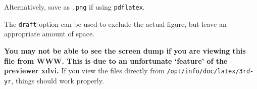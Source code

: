 Alternatively, save as \texttt{.png} if using \texttt{pdflatex}.

The \texttt{draft} option can be used to exclude the actual figure,
but leave an appropriate amount of space.

\textbf{You may not be able to see the screen dump if you are viewing this
file from WWW. This is due to an unfortunate `feature' of the
previewer xdvi.} If you view the files directly from
\texttt{/opt/info/doc/latex/3rd-yr}, things should work properly.

